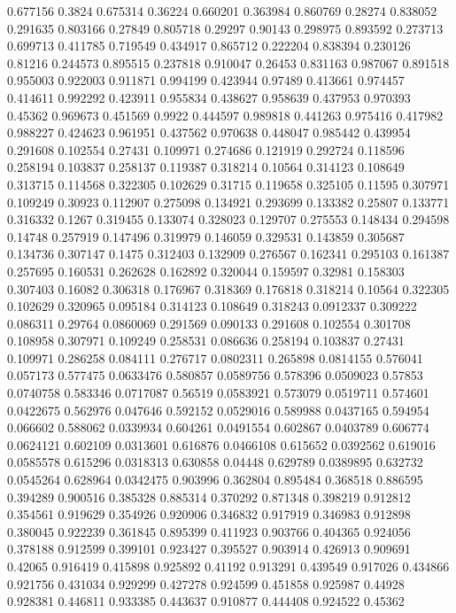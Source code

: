 0.677156 0.3824
0.675314 0.36224
0.660201 0.363984
0.860769 0.28274
0.838052 0.291635
0.803166 0.27849
0.805718 0.29297
0.90143 0.298975
0.893592 0.273713
0.699713 0.411785
0.719549 0.434917
0.865712 0.222204
0.838394 0.230126
0.81216 0.244573
0.895515 0.237818
0.910047 0.26453
0.831163 0.987067
0.891518 0.955003
0.922003 0.911871
0.994199 0.423944
0.97489 0.413661
0.974457 0.414611
0.992292 0.423911
0.955834 0.438627
0.958639 0.437953
0.970393 0.45362
0.969673 0.451569
0.9922 0.444597
0.989818 0.441263
0.975416 0.417982
0.988227 0.424623
0.961951 0.437562
0.970638 0.448047
0.985442 0.439954
0.291608 0.102554
0.27431 0.109971
0.274686 0.121919
0.292724 0.118596
0.258194 0.103837
0.258137 0.119387
0.318214 0.10564
0.314123 0.108649
0.313715 0.114568
0.322305 0.102629
0.31715 0.119658
0.325105 0.11595
0.307971 0.109249
0.30923 0.112907
0.275098 0.134921
0.293699 0.133382
0.25807 0.133771
0.316332 0.1267
0.319455 0.133074
0.328023 0.129707
0.275553 0.148434
0.294598 0.14748
0.257919 0.147496
0.319979 0.146059
0.329531 0.143859
0.305687 0.134736
0.307147 0.1475
0.312403 0.132909
0.276567 0.162341
0.295103 0.161387
0.257695 0.160531
0.262628 0.162892
0.320044 0.159597
0.32981 0.158303
0.307403 0.16082
0.306318 0.176967
0.318369 0.176818
0.318214 0.10564
0.322305 0.102629
0.320965 0.095184
0.314123 0.108649
0.318243 0.0912337
0.309222 0.086311
0.29764 0.0860069
0.291569 0.090133
0.291608 0.102554
0.301708 0.108958
0.307971 0.109249
0.258531 0.086636
0.258194 0.103837
0.27431 0.109971
0.286258 0.084111
0.276717 0.0802311
0.265898 0.0814155
0.576041 0.057173
0.577475 0.0633476
0.580857 0.0589756
0.578396 0.0509023
0.57853 0.0740758
0.583346 0.0717087
0.56519 0.0583921
0.573079 0.0519711
0.574601 0.0422675
0.562976 0.047646
0.592152 0.0529016
0.589988 0.0437165
0.594954 0.066602
0.588062 0.0339934
0.604261 0.0491554
0.602867 0.0403789
0.606774 0.0624121
0.602109 0.0313601
0.616876 0.0466108
0.615652 0.0392562
0.619016 0.0585578
0.615296 0.0318313
0.630858 0.04448
0.629789 0.0389895
0.632732 0.0545264
0.628964 0.0342475
0.903996 0.362804
0.895484 0.368518
0.886595 0.394289
0.900516 0.385328
0.885314 0.370292
0.871348 0.398219
0.912812 0.354561
0.919629 0.354926
0.920906 0.346832
0.917919 0.346983
0.912898 0.380045
0.922239 0.361845
0.895399 0.411923
0.903766 0.404365
0.924056 0.378188
0.912599 0.399101
0.923427 0.395527
0.903914 0.426913
0.909691 0.42065
0.916419 0.415898
0.925892 0.41192
0.913291 0.439549
0.917026 0.434866
0.921756 0.431034
0.929299 0.427278
0.924599 0.451858
0.925987 0.44928
0.928381 0.446811
0.933385 0.443637
0.910877 0.444408
0.924522 0.45362
